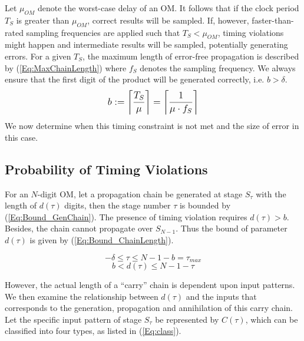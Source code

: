 \documentclass[journal]{IEEEtran}
\begin{document}
Let $\mu_{OM}$ denote the worst-case delay of an OM. It follows that if the clock period $T_S$ is greater than $\mu_{OM}$, correct results will be sampled. If, however, faster-than-rated sampling frequencies are applied such that $T_S<\mu_{OM}$, timing violations might happen and intermediate results will be sampled, potentially generating errors. For a given $T_S$, the maximum length of error-free propagation is described by (\ref{Eq:MaxChainLength}) where $f_S$ denotes the sampling frequency. We always ensure that the first digit of the product will be generated correctly, i.e. $b>\delta$.
%
\begin{eqnarray}\label{Eq:MaxChainLength}
\footnotesize
  b:=\left\lceil \frac{T_S}{\mu} \right\rceil=\left\lceil \frac{1}{\mu\cdot f_S}\right\rceil
\normalsize
\end{eqnarray}
%
We now determine when this timing constraint is not met and the size of error in this case.




\subsection{Probability of Timing Violations}\label{subsection:Prob}

For an $N$-digit OM, let a propagation chain be generated at stage $S_{\tau}$ with the length of $d(\tau)$ digits, then the stage number $\tau$ is bounded by (\ref{Eq:Bound_GenChain}). The presence of timing violation requires $d(\tau)>b$. Besides, the chain cannot propagate over $S_{N-1}$. Thus the bound of parameter $d(\tau)$ is given by (\ref{Eq:Bound_ChainLength}).


\begin{equation}\label{Eq:Bound_GenChain}
 -\delta\leq \tau\leq N-1-b=\tau_{max}
\end{equation}
\vspace{-3ex}
%
\begin{equation}\label{Eq:Bound_ChainLength}
  b<d(\tau)\leq N-1-\tau
\end{equation}
%

However, the actual length of a ``carry'' chain is dependent upon input patterns. We then examine the relationship between $d(\tau)$ and the inputs that corresponds to the generation, propagation and annihilation of this carry chain.  Let the specific input pattern of stage $S_{\tau}$ be represented by $C(\tau)$, which can be classified into four types, as listed in (\ref{Eq:class}). 
\end{document}
